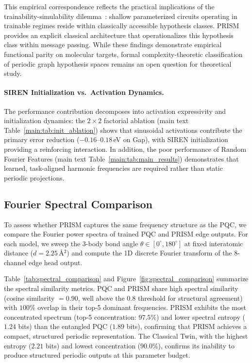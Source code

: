 \documentclass[10pt,twocolumn,letterpaper]{article}
\begin{document}
This empirical correspondence reflects the practical implications of the trainability-simulability dilemma~\cite{Cerezo:2023nqf}: shallow parameterized circuits operating in trainable regimes reside within classically accessible hypothesis classes. PRISM provides an explicit classical architecture that operationalizes this hypothesis class within message passing. While these findings demonstrate empirical functional parity on molecular targets, formal complexity-theoretic classification of periodic graph hypothesis spaces remains an open question for theoretical study.

\paragraph{SIREN Initialization vs.\ Activation Dynamics.}
The performance contribution decomposes into activation expressivity and initialization dynamics: the $2 \times 2$ factorial ablation (main text Table~\ref{main:tab:init_ablation}) shows that sinusoidal activations contribute the primary error reduction ($-0.16\text{--}0.18$\,eV on Gap), with SIREN initialization providing a reinforcing interaction. In addition, the poor performance of Random Fourier Features (main text Table~\ref{main:tab:main_results}) demonstrates that learned, task-aligned harmonic frequencies are required rather than static periodic projections.

\subsection{Fourier Spectral Comparison}

To assess whether PRISM captures the same frequency structure as the PQC, we compare the Fourier power spectra of trained PQC and PRISM edge outputs. For each model, we sweep the 3-body bond angle $\theta \in [0^\circ, 180^\circ]$ at fixed interatomic distance ($d = 2.25$\,\AA$^2$) and compute the 1D discrete Fourier transform of the 8-channel edge head output.

Table~\ref{tab:spectral_comparison} and Figure~\ref{fig:spectral_comparison} summarize the spectral similarity metrics. PQC and PRISM share high spectral similarity (cosine similarity $= 0.90$, well above the $0.8$ threshold for structural agreement) with $100\%$ overlap in their top-5 dominant frequencies. PRISM exhibits the most concentrated spectrum (top-5 concentration: $97.5\%$) and lower spectral entropy ($1.24$ bits) than the entangled PQC ($1.89$ bits), confirming that PRISM achieves a compact, structured periodic representation. The Classical Twin, with the highest entropy ($2.21$ bits) and lowest concentration ($90.0\%$), confirms its inability to produce structured periodic outputs at this parameter budget.
\end{document}
